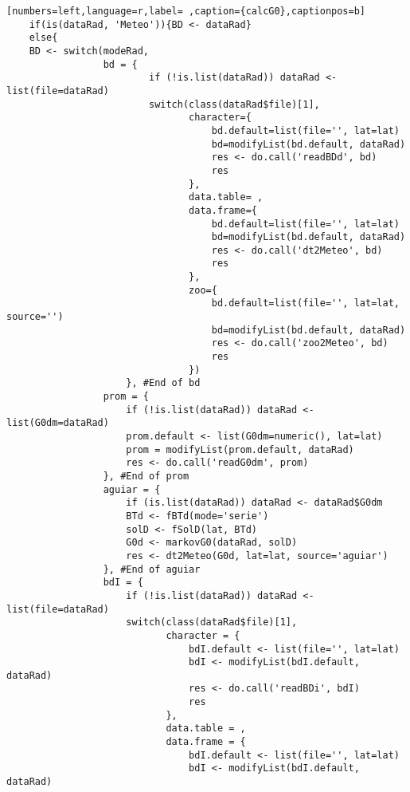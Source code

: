 \begin{lstlisting}[numbers=left,language=r,label= ,caption={calcG0},captionpos=b]
    if(is(dataRad, 'Meteo')){BD <- dataRad}
    else{
    BD <- switch(modeRad,
                 bd = {
                         if (!is.list(dataRad)) dataRad <- list(file=dataRad)
                         switch(class(dataRad$file)[1],
                                character={
                                    bd.default=list(file='', lat=lat)
                                    bd=modifyList(bd.default, dataRad)
                                    res <- do.call('readBDd', bd)
                                    res
                                },
                                data.table= ,
                                data.frame={
                                    bd.default=list(file='', lat=lat)
                                    bd=modifyList(bd.default, dataRad)
                                    res <- do.call('dt2Meteo', bd)
                                    res
                                },
                                zoo={
                                    bd.default=list(file='', lat=lat, source='')
                                    bd=modifyList(bd.default, dataRad)
                                    res <- do.call('zoo2Meteo', bd)
                                    res
                                })
                     }, #End of bd
                 prom = {
                     if (!is.list(dataRad)) dataRad <- list(G0dm=dataRad)
                     prom.default <- list(G0dm=numeric(), lat=lat)
                     prom = modifyList(prom.default, dataRad)
                     res <- do.call('readG0dm', prom)
                 }, #End of prom
                 aguiar = {
                     if (is.list(dataRad)) dataRad <- dataRad$G0dm
                     BTd <- fBTd(mode='serie')
                     solD <- fSolD(lat, BTd)
                     G0d <- markovG0(dataRad, solD)
                     res <- dt2Meteo(G0d, lat=lat, source='aguiar')
                 }, #End of aguiar
                 bdI = {
                     if (!is.list(dataRad)) dataRad <- list(file=dataRad)
                     switch(class(dataRad$file)[1],
                            character = {
                                bdI.default <- list(file='', lat=lat)
                                bdI <- modifyList(bdI.default, dataRad)
                                res <- do.call('readBDi', bdI)
                                res
                            },
                            data.table = ,
                            data.frame = {
                                bdI.default <- list(file='', lat=lat)
                                bdI <- modifyList(bdI.default, dataRad)

\end{lstlisting}

